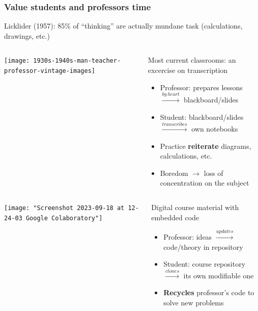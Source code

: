 \documentclass[aspectratio=169]{beamer}
\begin{document}
\begin{frame}
	\frametitle{Value students and professors time}
	Licklider (1957): 85\% of ``thinking'' are actually mundane task (calculations, drawings, etc.)
	\pause
	\begin{block}{}
	  \begin{columns}[b]
			\begin{column}{0.25\textwidth}
				\texttt{[image: 1930s-1940s-man-teacher-professor-vintage-images]}
			\end{column}
			\begin{column}{0.65\textwidth}
				Most current classrooms: an excercise on transcription
				\begin{itemize}[<+->]
					\item Professor: prepares lessons \(\xrightarrow{by\, heart}\) blackboard/slides
					\item Student: blackboard/slides \(\xrightarrow{transcribes}\) own notebooks
					\item Practice \textbf{reiterate} diagrams, calculations, etc.
					\item Boredom \(\rightarrow \) loss of concentration on the subject
				\end{itemize}
			\end{column}
		\end{columns}
	\end{block}
	\pause
	\begin{block}{}
	  \begin{columns}[b]
			\begin{column}{0.25\textwidth}
				\texttt{[image: "Screenshot 2023-09-18 at 12-24-03 Google Colaboratory"]}
			\end{column}
			\begin{column}{0.65\textwidth}
				Digital course material with embedded code
				\begin{itemize}[<+->]
					\item Professor: ideas \(\xrightarrow{updates}\) code/theory in repository
					\item Student: course repository \(\xrightarrow{clones}\) its own modifiable one
					\item \textbf{Recycles} professor's code to solve new problems
				\end{itemize}
			\end{column}
		\end{columns}
	\end{block}
\end{frame}
\end{document}

